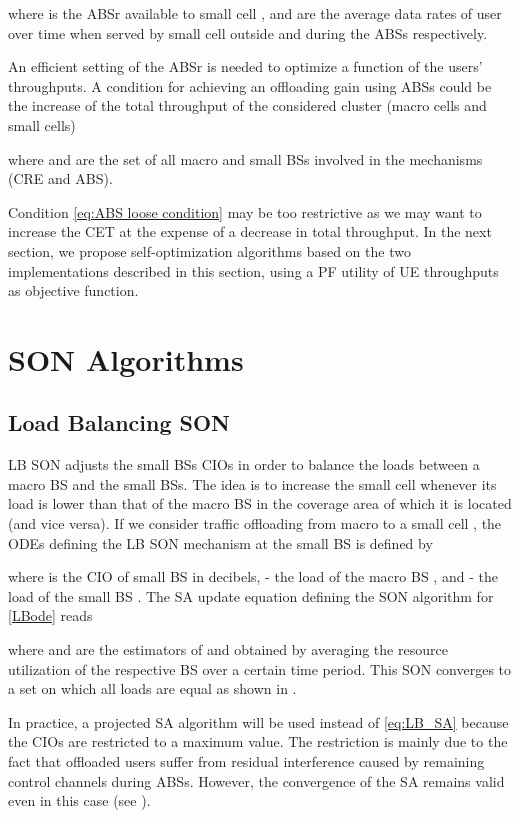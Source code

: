\documentclass[conference]{IEEEtran}
\begin{document}
	where  is the \ac{ABSr} available to small cell ,  and  are the average data rates of user  over time when served by small cell  outside and during the \acp{ABS} respectively.
	
	An efficient setting of the \ac{ABSr} is needed to optimize a function of the users' throughputs. A condition for achieving an offloading gain using \acp{ABS} could be the increase of the total throughput of the considered cluster (macro cells and small cells)
	
	where  and  are the set of all macro and small \acp{BS} involved in the mechanisms (\ac{CRE} and \ac{ABS}).
	
	Condition \eqref{eq:ABS loose condition} may be too restrictive as we may want to increase the \ac{CET} at the expense of a decrease in total throughput. In the next section, we propose self-optimization algorithms based on the two implementations described in this section, using a PF utility of \ac{UE} throughputs as objective function.
	
\section{SON Algorithms} \label{sec:son_algorithms}

\subsection{Load Balancing SON}
\ac{LB} \ac{SON} adjusts the small \acp{BS} \acp{CIO} in order to balance the loads between a macro \ac{BS} and the small \acp{BS}. The idea is to increase the small cell whenever its load is lower than that of the macro \ac{BS} in the coverage area of which it is located (and vice versa). If we consider traffic offloading from macro  to a small cell , the \acp{ODE} defining the \ac{LB} \ac{SON} mechanism at the small \ac{BS} is defined by

where  is the \ac{CIO} of small \ac{BS}  in decibels,  - the load of the macro \ac{BS} , and  - the load of the small \ac{BS} .
	The \ac{SA} update equation defining the \ac{SON} algorithm for \eqref{LBode} reads

where  and  are the estimators of  and  obtained by averaging the resource utilization of the respective \ac{BS} over a certain time period. This SON converges to a set on which all loads are equal as shown in \cite[Theorem 4]{CombesInfocom2012}.
	
	In practice, a projected \ac{SA} algorithm will be used instead of \eqref{eq:LB_SA} because the \acp{CIO} are restricted to a maximum value. The restriction is mainly due to the fact that offloaded users suffer from residual interference caused by remaining control channels during \acp{ABS}. However, the convergence of the \ac{SA} remains valid even in this case (see \cite[§5.4]{Borkar}).
\end{document}
